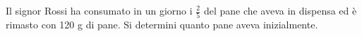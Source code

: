 Il signor Rossi ha consumato in un giorno i $\displaystyle \frac{2}{5}$
del pane che aveva in dispensa ed è rimasto con 120 g %
di pane. 
Si determini quanto pane aveva inizialmente.
